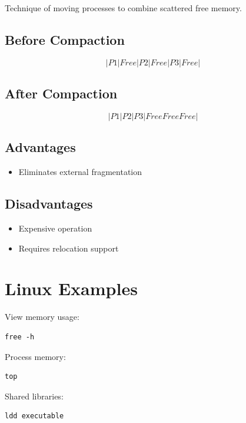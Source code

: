 Technique of moving processes to combine scattered free memory.

\subsection{Before Compaction}

\[
|P1|Free|P2|Free|P3|Free|
\]

\subsection{After Compaction}

\[
|P1|P2|P3|FreeFreeFree|
\]

\subsection{Advantages}

\begin{itemize}
\item Eliminates external fragmentation
\end{itemize}

\subsection{Disadvantages}

\begin{itemize}
\item Expensive operation
\item Requires relocation support
\end{itemize}

\section{Linux Examples}

View memory usage:

\begin{verbatim}
free -h
\end{verbatim}

Process memory:

\begin{verbatim}
top
\end{verbatim}

Shared libraries:

\begin{verbatim}
ldd executable
\end{verbatim}

